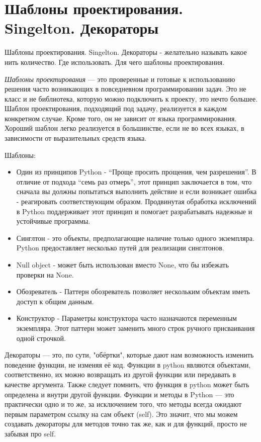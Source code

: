 \section{Шаблоны проектирования. Singelton. Декораторы}

Шаблоны проектирования. Singelton. Декораторы - желательно называть какое нить количество. Где использовать. Для чего шаблоны проектирования.

\textit{Шаблоны проектирования} — это проверенные и готовые к использованию решения часто возникающих в повседневном программировании задач. Это не класс и не библиотека, которую можно подключить к проекту, это нечто большее. Шаблон проектирования, подходящий под задачу, реализуется в каждом конкретном случае. Кроме того, он не зависит от языка программирования. Хороший шаблон легко реализуется в большинстве, если не во всех языках, в зависимости от выразительных средств языка.

Шаблоны:
\begin{itemize}
\item Один из принципов Python - “Проще просить прощения, чем разрешения”. В отличие от подхода “семь раз отмерь”, этот принцип заключается в том, что сначала вы должны попытаться выполнить действие и если возникает ошибка - реагировать соответствующим образом. Продвинутая обработка исключений в Python поддерживает этот принцип и помогает разрабатывать надежные и устойчивые программы.
\item Синглтон - это объекты, предполагающие наличие только одного экземпляра. Python предоставляет несколько путей для реализации синглтонов.
\item Null object - может быть использован вместо None, что бы избежать проверки на None.
\item Обозреватель - Паттерн обозреватель позволяет нескольким объектам иметь доступ к общим данным.
\item Конструктор - Параметры конструктора часто назначаются переменным экземпляра. Этот паттерн может заменить много строк ручного присваивания одной строчкой.
\end{itemize}

Декораторы — это, по сути, "обёртки", которые дают нам возможность изменить поведение функции, не изменяя её код. Функции в python являются объектами, соответственно, их можно возвращать из другой функции или передавать в качестве аргумента. Также следует помнить, что функция в python может быть определена и внутри другой функции.
Функции и методы в Python — это практически одно и то же, за исключением того, что методы всегда ожидают первым параметром ссылку на сам объект (self). Это значит, что мы можем создавать декораторы для методов точно так же, как и для функций, просто не забывая про self.


